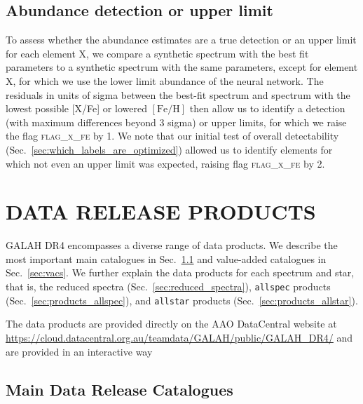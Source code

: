 \documentclass[
  journal=pasa,
  manuscript=research-paper, %
  year=2024,
  volume=37
]{cup-journal}
\newcommand{\feh}{$\mathrm{[Fe/H]}$\xspace}
\begin{document}
\subsection{Abundance detection or upper limit}
\label{sec:abundance_detection_or_upper_limit}

To assess whether the abundance estimates are a true detection or an upper limit for each element X, we compare a synthetic spectrum with the best fit parameters to a synthetic spectrum with the same parameters, except for element X, for which we use the lower limit abundance of the neural network. The residuals in units of sigma between the best-fit spectrum and spectrum with the lowest possible [X/Fe] or lowered \feh then allow us to identify a detection (with maximum differences beyond 3 sigma) or upper limits, for which we raise the flag \textsc{flag\_x\_fe} by 1. We note that our initial test of overall detectability (Sec.~\ref{sec:which_labels_are_optimized}) allowed us to identify elements for which not even an upper limit was expected, raising flag \textsc{flag\_x\_fe} by 2.

\section{DATA RELEASE PRODUCTS}
\label{sec:catalogues_release_products}

GALAH DR4 encompasses a diverse range of data products. We describe the most important main catalogues in Sec.~\ref{sec:data_release_catalogues} and value-added catalogues in Sec.~\ref{sec:vacs}. We further explain the data products for each spectrum and star, that is, the reduced spectra (Sec.~\ref{sec:reduced_spectra}), \texttt{allspec} products (Sec.~\ref{sec:products_allspec}), and \texttt{allstar} products (Sec.~\ref{sec:products_allstar}).

The data products are provided directly on the AAO DataCentral website at \url{https://cloud.datacentral.org.au/teamdata/GALAH/public/GALAH_DR4/} and are provided in an interactive way 

\subsection{Main Data Release Catalogues}
\label{sec:data_release_catalogues}
\end{document}
